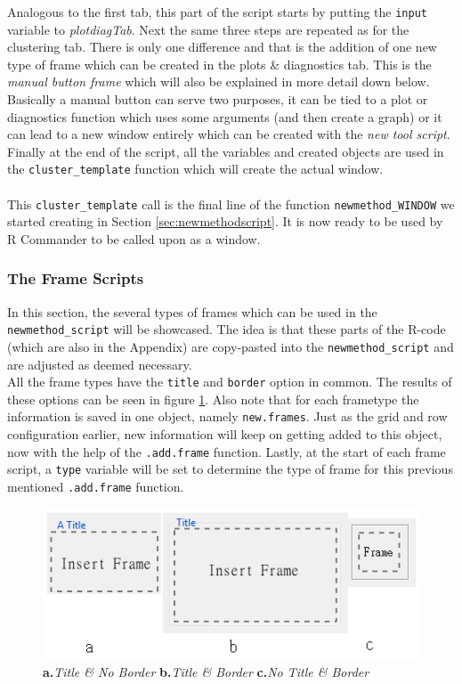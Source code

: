 \documentclass[a4paper]{article}\usepackage[]{graphicx}\usepackage[]{color}
\begin{document}
\noindent Analogous to the first tab, this part of the script starts by
putting the \verb|input| variable to {\it plotdiagTab}. Next the same three
steps are repeated as for the clustering tab. There is only one difference and
that is the addition of one new type of frame which can be created in the plots
\& diagnostics tab.
This is the {\it manual button frame} which will also be explained in more
detail down below. Basically a manual button can serve two purposes, it can be
tied to a plot or diagnostics function which uses some arguments (and then
create a graph) or it can lead to a new window entirely which can be created
with the {\it new tool script}.\\
Finally at the end of the script, all the variables and created objects are used
in the \verb|cluster_template| function which will create the actual window.
\\ \\
This \verb|cluster_template| call is the final line of the function
\verb|newmethod_WINDOW| we started creating in Section
\ref{sec:newmethodscript}. It is now ready to be used by R Commander to be
called upon as a window.

\subsubsection{The Frame Scripts}
In this section, the several types of frames which can be used in the
\verb|newmethod_script| will be showcased. The idea is that these parts of the
R-code (which are also in the Appendix) are copy-pasted into the
\verb|newmethod_script| and are adjusted as deemed necessary. \\
All the frame types have the \verb|title| and
\verb|border| option in common. The results of these options can be seen in
figure \ref{titleborder}. Also note that for each frametype the information is saved in
one object, namely \verb|new.frames|. Just as the grid and row configuration
earlier, new information will keep on getting added to this object, now with
the help of the \verb|.add.frame| function. Lastly, at the start of each frame
script, a \verb|type| variable will be set to determine the type of frame for
this previous mentioned \verb|.add.frame| function.

\begin{figure}[H]
\centering
\includegraphics[scale=0.5]{figures/title_border.png}
\caption{{\bf a.}{\it Title \& No Border} {\bf b.}{\it Title \& Border} {\bf
c.}{\it No Title \& Border}
\label{titleborder}}
\end{figure}
\end{document}
